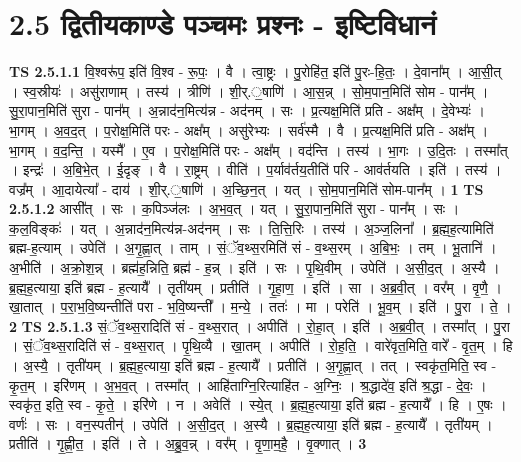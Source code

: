 \documentclass[17pt]{extarticle}
\begin{document}
\section*{ 2.5      द्वितीयकाण्डे पञ्चमः प्रश्नः - इष्टिविधानं }
                                \textbf{ TS 2.5.1.1} \newline
                  वि॒श्वरू॑प॒ इति॑ वि॒श्व - रू॒पः॒ । वै । त्वा॒ष्ट्रः । पु॒रोहि॑त॒ इति॑ पु॒रः-हि॒तः॒ । दे॒वाना᳚म् । आ॒सी॒त् । स्व॒स्रीयः॑ । असु॑राणाम् । तस्य॑ । त्रीणि॑ । शी॒र्.॒षाणि॑ । आ॒स॒न्न् । सो॒म॒पान॒मिति॑ सोम - पान᳚म् । सु॒रा॒पान॒मिति॑ सुरा - पान᳚म् । अ॒न्नाद॑न॒मित्य॑न्न - अद॑नम् । सः । प्र॒त्यक्ष॒मिति॑ प्रति - अक्ष᳚म् । दे॒वेभ्यः॑ । भा॒गम् । अ॒व॒द॒त् । प॒रोक्ष॒मिति॑ परः - अक्ष᳚म् । असु॑रेभ्यः । सर्व॑स्मै । वै । प्र॒त्यक्ष॒मिति॑ प्रति - अक्ष᳚म् । भा॒गम् । व॒द॒न्ति॒ । यस्मै᳚ । ए॒व । प॒रोक्ष॒मिति॑ परः - अक्ष᳚म् । वद॑न्ति । तस्य॑ । भा॒गः । उ॒दि॒तः । तस्मा᳚त् । इन्द्रः॑ । अ॒बि॒भे॒त् । ई॒दृङ् । वै । रा॒ष्ट्रम् । वीति॑ । प॒र्याव॑र्तय॒तीति॑ परि - आव॑र्तयति । इति॑ । तस्य॑ । वज्र᳚म् । आ॒दायेत्या᳚ - दाय॑ । शी॒र्.॒षाणि॑ । अ॒च्छि॒न॒त् । यत् । सो॒म॒पान॒मिति॑ सोम-पान᳚म् । \textbf{  1 } \newline
                  \newline
                                \textbf{ TS 2.5.1.2} \newline
                  आसी᳚त् । सः । क॒पिञ्ज॑लः । अ॒भ॒व॒त् । यत् । सु॒रा॒पान॒मिति॑ सुरा - पान᳚म् । सः । क॒ल॒विङ्कः॑ । यत् । अ॒न्नाद॑न॒मित्य॑न्न-अद॑नम् । सः । ति॒त्ति॒रिः । तस्य॑ । अ॒ञ्ज॒लिना᳚ । ब्र॒ह्म॒ह॒त्यामिति॑ ब्रह्म-ह॒त्याम् । उपेति॑ । अ॒गृ॒ह्णा॒त् । ताम् । सं॒ॅव॒थ्स॒रमिति॑ सं - व॒थ्स॒रम् । अ॒बि॒भः॒ । तम् । भू॒तानि॑ । अ॒भीति॑ । अ॒क्रो॒श॒न्न् । ब्रह्म॑ह॒न्निति॒ ब्रह्म॑ - ह॒न्न् । इति॑ । सः । पृ॒थि॒वीम् । उपेति॑ ।  अ॒सी॒द॒त् । अ॒स्यै । ब्र॒ह्म॒ह॒त्याया॒ इति॑ ब्रह्म - ह॒त्यायै᳚ । तृती॑यम् । प्रतीति॑ । गृ॒हा॒ण॒ । इति॑ । सा । अ॒ब्र॒वी॒त् । वर᳚म् । वृ॒णै॒ । खा॒तात् । प॒रा॒भ॒वि॒ष्यन्तीति॑ परा - भ॒वि॒ष्यन्ती᳚ । म॒न्ये॒ । ततः॑ । मा । परेति॑ । भू॒व॒म् । इति॑ । पु॒रा । ते॒ । \textbf{  2} \newline
                  \newline
                                \textbf{ TS 2.5.1.3} \newline
                  सं॒ॅव॒थ्स॒रादिति॑ सं - व॒थ्स॒रात् । अपीति॑ । रो॒हा॒त् । इति॑ । अ॒ब्र॒वी॒त् । तस्मा᳚त् । पु॒रा । सं॒ॅव॒थ्स॒रादिति॑ सं - व॒थ्स॒रात् । पृ॒थि॒व्यै । खा॒तम् । अपीति॑ ।  रो॒ह॒ति॒ । वारे॑वृत॒मिति॒ वारे᳚ - वृ॒त॒म् । हि ।  अ॒स्यै॒ । तृती॑यम् । ब्र॒ह्म॒ह॒त्याया॒ इति॑ ब्रह्म - ह॒त्यायै᳚ । प्रतीति॑ । अ॒गृ॒ह्णा॒त् । तत् । स्वकृ॑त॒मिति॒ स्व - कृ॒त॒म् । इरि॑णम् । अ॒भ॒व॒त् । तस्मा᳚त् । आहि॑ताग्नि॒रित्याहि॑त - अ॒ग्निः॒ । श्र॒द्धादे॑व॒ इति॑ श्र॒द्धा - दे॒वः॒ । स्वकृ॑त॒ इति॒ स्व - कृ॒ते॒ । इरि॑णे । न । अवेति॑ । स्ये॒त् । ब्र॒ह्म॒ह॒त्याया॒ इति॑ ब्रह्म - ह॒त्यायै᳚ । हि । ए॒षः । वर्णः॑ । सः । वन॒स्पतीन्॑ । उपेति॑ । अ॒सी॒द॒त् । अ॒स्यै । ब्र॒ह्म॒ह॒त्याया॒ इति॑ ब्रह्म - ह॒त्यायै᳚ । तृती॑यम् । प्रतीति॑ । गृ॒ह्णी॒त॒ । इति॑ । ते । अ॒ब्रु॒व॒न्न् । वर᳚म् । वृ॒णा॒म॒है॒ । वृ॒क्णात् । \textbf{  3} \newline
\end{document}

